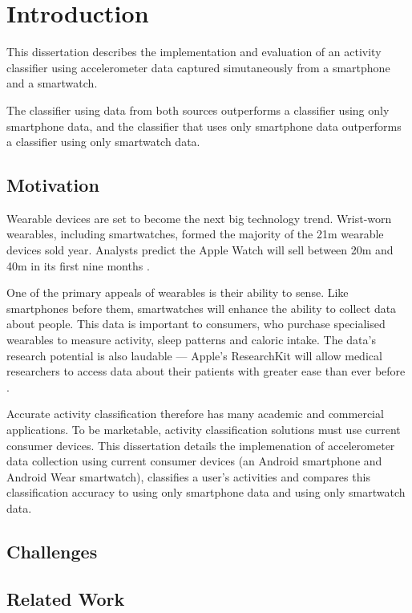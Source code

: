 \chapter{Introduction}
  This dissertation describes the implementation and evaluation of an activity classifier using 
  accelerometer data captured simutaneously from a smartphone and a smartwatch. 
  
  The classifier using data from both sources outperforms a classifier using only smartphone data,
  and the classifier that uses only smartphone data outperforms a classifier using only smartwatch 
  data.
  \section{Motivation}
  \label{sec:intro-motivation}
    Wearable devices are set to become the next big technology trend. Wrist-worn wearables, 
    including smartwatches, formed the majority of the 21m wearable devices sold year. Analysts
    predict the Apple Watch will sell between 20m and 40m in its first nine months 
    \cite{econapplewatch}.
    
    One of the primary appeals of wearables is their ability to sense. Like smartphones before them,
    smartwatches will enhance the ability to collect data about people. This data is important to
    consumers, who purchase specialised wearables to measure activity, sleep patterns and 
    caloric intake. The data's research potential is also laudable --- Apple's ResearchKit will
    allow medical researchers to access data about their patients with greater ease than ever
    before \cite{appleresearchkit}.
        
    Accurate activity classification therefore has many academic and commercial applications. To be
    marketable, activity classification solutions must use current consumer devices. This 
    dissertation details the implemenation of accelerometer data collection using current consumer 
    devices (an Android smartphone and Android Wear smartwatch), classifies a user's activities and 
    compares this classification accuracy to using only smartphone data and using only smartwatch 
    data. 
    
  \section{Challenges}
  \label{sec:intro-challenges}
  
  \section{Related Work}
  \label{sec:intro-relatedwork}
